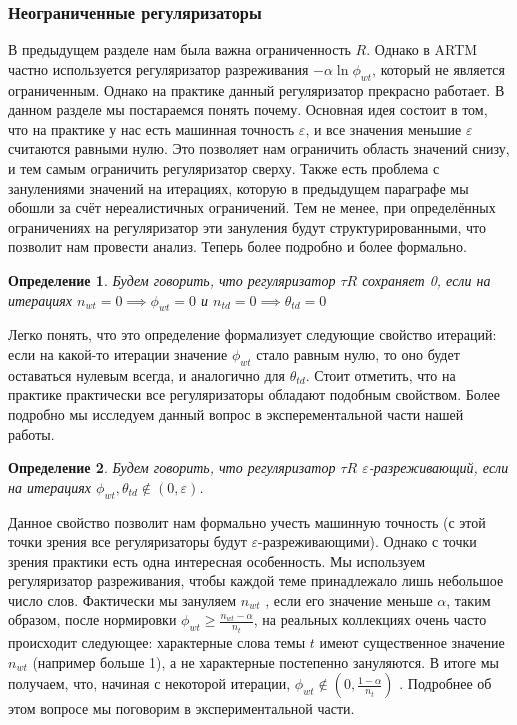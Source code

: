 \documentclass[12pt]{article}
\newtheorem{definition}{Определение}[section]
\renewcommand{\geq}{\geqslant}
\begin{document}
\subsubsection{Неограниченные регуляризаторы}
В предыдущем разделе нам была важна ограниченность $R$. Однако в ARTM частно используется регуляризатор разреживания $- \alpha \ln \phi_{wt}$, который не является ограниченным. Однако на практике данный регуляризатор прекрасно работает. В данном разделе мы постараемся понять почему. Основная идея состоит в том, что на практике у нас есть машинная точность $\varepsilon$, и все значения меньшие $\varepsilon$ считаются равными нулю. Это позволяет нам ограничить область значений снизу, и тем самым ограничить регуляризатор сверху. Также есть проблема с занулениями значений на итерациях, которую в предыдущем параграфе мы обошли за счёт нереалистичных ограничений. Тем не менее, при определённых  ограничениях на регуляризатор эти зануления будут структурированными, что позволит нам провести анализ. Теперь более подробно и более формально.
\begin{definition}
Будем говорить, что регуляризатор $\tau R$ сохраняет 0, если на итерациях $n_{wt} = 0 \implies \phi_{wt} = 0$ и $n_{td} = 0 \implies \theta_{td} = 0$
\end{definition}
Легко понять, что это определение формализует следующие свойство итераций: если на какой-то итерации значение $\phi_{wt}$ стало равным нулю, то оно будет оставаться нулевым всегда, и аналогично для $\theta_{td}$.
Стоит отметить, что на практике практически все регуляризаторы обладают подобным свойством. Более подробно мы исследуем данный вопрос в эксперементальной части нашей работы.
\begin{definition}
Будем говорить, что регуляризатор $\tau R$ $\varepsilon$-разреживающий, если на итерациях $\phi_{wt}, \theta_{td} \notin (0, \varepsilon)$.
\end{definition}
Данное свойство позволит нам формально учесть машинную точность (с этой точки зрения все регуляризаторы будут $\varepsilon$-разреживающими). Однако с точки зрения практики есть одна интересная особенность. Мы используем регуляризатор разреживания, чтобы каждой теме принадлежало лишь небольшое число слов. Фактически мы зануляем $n_{wt}$ , если его значение меньше $\alpha$, таким образом, после нормировки $\phi_{wt} \geq \frac{n_{wt} - \alpha}{n_t}$,  на реальных коллекциях очень часто происходит следующее: характерные слова темы $t$ имеют существенное значение $n_{wt}$ (например больше 1), а не характерные постепенно зануляются. В итоге мы получаем, что, начиная с некоторой итерации, $\phi_{wt} \notin (0, \frac{1-\alpha}{n_t})$ . Подробнее об этом вопросе мы поговорим в экспериментальной части.\\
\end{document}
